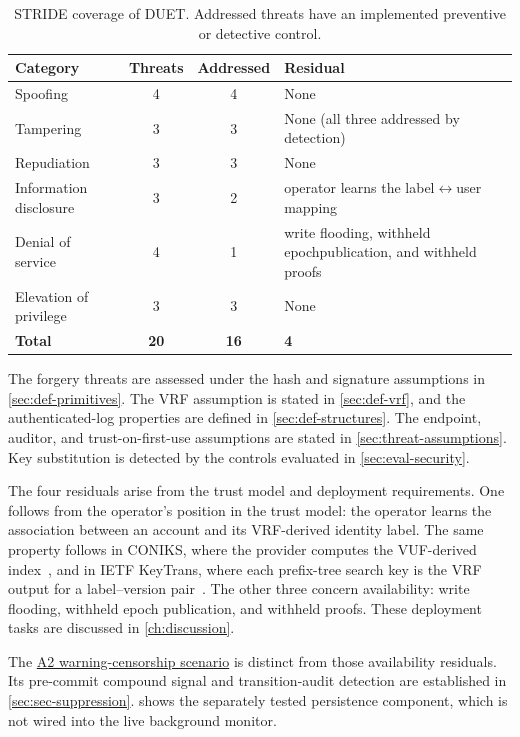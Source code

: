 \begin{table}[H]
\centering
\caption[STRIDE coverage of DUET.]{STRIDE coverage of DUET. Addressed threats have an implemented
preventive or detective control.}
\label{tab:eval-stride}
\small
\begin{tabular}{@{}lccp{6.0cm}@{}}
\toprule
Category & Threats & Addressed & Residual \\
\midrule
Spoofing & 4 & 4 & None \\
Tampering & 3 & 3 & None (all three addressed by detection) \\
Repudiation & 3 & 3 & None \\
Information disclosure & 3 & 2 & operator learns the label$\leftrightarrow$user mapping \\
Denial of service & 4 & 1 & write flooding, withheld epoch\newline publication, and withheld proofs \\
Elevation of privilege & 3 & 3 & None \\
\midrule
\textbf{Total} & \textbf{20} & \textbf{16} & \textbf{4} \\
\bottomrule
\end{tabular}
\end{table}

The forgery threats are assessed under the hash and signature assumptions in \cref{sec:def-primitives}.
The VRF assumption is stated in \cref{sec:def-vrf}, and the authenticated-log properties are defined
in \cref{sec:def-structures}. The endpoint, auditor, and trust-on-first-use assumptions are stated in
\cref{sec:threat-assumptions}. Key substitution is detected by the controls evaluated in
\cref{sec:eval-security}.

The four residuals arise from the trust model and deployment requirements. One follows from the
operator's position in the trust model: the operator learns the association between an account and its VRF-derived
identity label. The same property follows in CONIKS, where the provider computes the VUF-derived
index~\cite[Section~3.4]{melara2015coniks}, and in IETF KeyTrans, where each prefix-tree search key
is the VRF output for a label--version pair~\cite[Section~11.7]{ietf-keytrans-protocol}. The other
three concern availability: write flooding, withheld epoch publication, and withheld proofs. These
deployment tasks are discussed in \cref{ch:discussion}.

The \hyperref[sc:threat-a2]{A2 warning-censorship scenario} is distinct from those availability
residuals. Its pre-commit compound signal and transition-audit detection are established in
\cref{sec:sec-suppression}.  shows the separately tested persistence component,
which is not wired into the live background monitor.

